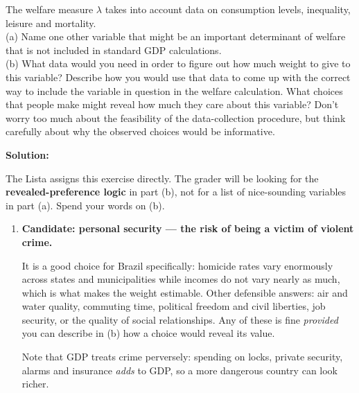 \documentclass[12pt, letterpaper]{article}
\begin{document}
\begin{tcolorbox}[evenbox,title={Problem 2.2 \quad Other Things that Matter}]
\begin{tcolorbox}[questionbox]
The welfare measure $\lambda$ takes into account data on consumption levels, inequality,
leisure and mortality.\\[3pt]
(a) Name one other variable that might be an important determinant of welfare that is not
included in standard GDP calculations.\\
(b) What data would you need in order to figure out how much weight to give to this
variable? Describe how you would use that data to come up with the correct way to include
the variable in question in the welfare calculation. What choices that people make might
reveal how much they care about this variable? Don't worry too much about the feasibility of
the data-collection procedure, but think carefully about why the observed choices would be
informative.
\end{tcolorbox}

\textbf{Solution:}

\begin{tcolorbox}[theorybox,title={This is question 2 of Lista de Exerc\'icios 1 (2 pts)}]
The Lista assigns this exercise directly. The grader will be looking for the
\textbf{revealed-preference logic} in part (b), not for a list of nice-sounding variables in
part (a). Spend your words on (b).
\end{tcolorbox}

\begin{enumerate}

\item \textbf{Candidate: personal security --- the risk of being a victim of violent crime.}

It is a good choice for Brazil specifically: homicide rates vary enormously across states and
municipalities while incomes do not vary nearly as much, which is what makes the weight
estimable. Other defensible answers: air and water quality, commuting time, political
freedom and civil liberties, job security, or the quality of social relationships. Any of
these is fine \emph{provided} you can describe in (b) how a choice would reveal its value.

Note that GDP treats crime perversely: spending on locks, private security, alarms and
insurance \emph{adds} to GDP, so a more dangerous country can look richer.


\end{enumerate}
\end{tcolorbox}
\end{document}
